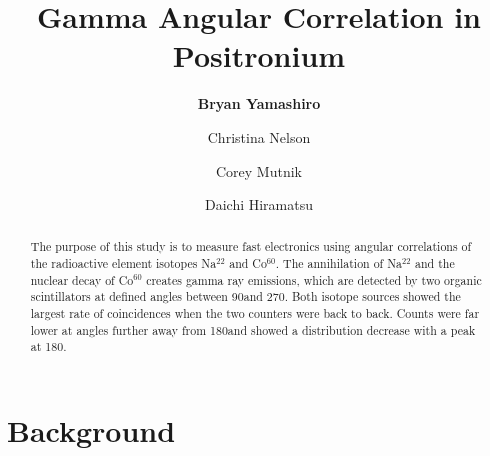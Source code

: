 \documentclass[aps,prl,twocolumn,superscriptaddress]{revtex4-1}
\begin{document}





\title{Gamma Angular Correlation in Positronium}


\author{\textbf{Bryan Yamashiro}}
\author{Christina Nelson}
\author{Corey Mutnik}
\author{Daichi Hiramatsu}



\begin{abstract}

The purpose of this study is to measure fast electronics using angular correlations of the radioactive element isotopes Na$^{22}$ and Co$^{60}$.  The annihilation of Na$^{22}$ and the nuclear decay of Co$^{60}$ creates gamma ray emissions, which are detected by two organic scintillators at defined angles between 90\degree and 270\degree. Both isotope sources showed the largest rate of coincidences when the two counters were back to back. Counts were far lower at angles further away from 180\degree and showed a distribution decrease with a peak at 180\degree.





\end{abstract}

\maketitle    %


\section{Background}
\end{document}
